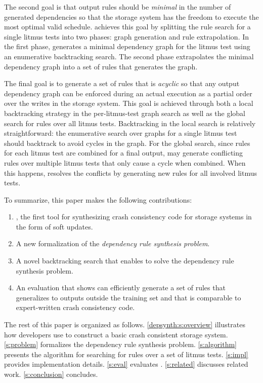 The second goal is that output rules should be \textit{minimal} in the number of generated dependencies
so that the storage system has the freedom to execute the most optimal valid schedule. \depsynth achieves this
goal by splitting the rule search for a single litmus tests into two phases: graph generation and rule
extrapolation. In the first phase, \depsynth generates a minimal dependency graph for the litmus test
using an enumerative backtracking search. The second phase extrapolates the minimal dependency graph
into a set of rules that generates the graph.

The final goal is to generate a set of rules that is \textit{acyclic} so that any output dependency graph
can be enforced during an actual execution as a partial order over the writes in the storage system.
This goal is achieved through both a local backtracking strategy in the per-litmus-test graph search
as well as the global search for rules over all litmus tests. Backtracking in the local search is
relatively straightforward: the enumerative search over graphs for a single litmus test should backtrack
to avoid cycles in the graph. For the global search, since rules for each litmus test are combined for a
final output, \depsynth may
generate conflicting rules over multiple litmus tests that only cause a cycle when combined.
When this happens, \depsynth resolves the conflicts by generating new rules for all
involved litmus tests.

To summarize, this paper makes the following contributions:
\begin{enumerate}
  \item \depsynth, the first tool for synthesizing crash consistency code for storage systems
        in the form of soft updates.
  \item A new formalization of the \textit{dependency rule synthesis problem}. %
  \item A novel backtracking search that enables \depsynth to solve the dependency rule synthesis problem.
  \item An evaluation that shows \depsynth can efficiently generate a set of rules that generalizes
        to outputs outside the training set and that is comparable to expert-written crash consistency code.
\end{enumerate}

The rest of this paper is organized as follows.
\autoref{depsynth:s:overview} illustrates how developers use \depsynth to construct a basic crash consistent storage system.
\autoref{s:problem} formalizes the dependency rule synthesis problem.
\autoref{s:algorithm} presents the \depsynth algorithm for searching for rules over a set of litmus tests.
\autoref{s:impl} provides implementation details.
\autoref{s:eval} evaluates \depsynth.
\autoref{s:related} discusses related work.
\autoref{s:conclusion} concludes.
\fi

